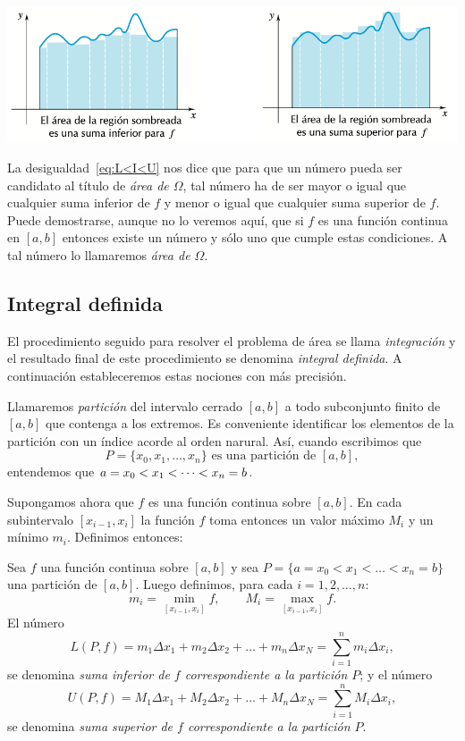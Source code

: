 \centerline{
  \includegraphics[width=.9\textwidth]{pics/sumas-superiores-inferiores.png}
}

La desigualdad~\eqref{eq:L<I<U} nos dice que para que un número pueda ser candidato al título de \emph{área de $\Omega$}, tal número ha de ser mayor o igual que cualquier suma inferior de $f$ y menor o igual que cualquier suma superior de $f$. Puede demostrarse, aunque no lo veremos aquí, que si $f$ es una función continua en $[a,b]$ entonces existe un número y sólo uno que cumple estas condiciones. A tal número lo llamaremos \emph{área de $\Omega$}.

\subsection*{Integral definida}

El procedimiento seguido para resolver el problema de área se llama \emph{integración} y el resultado final de este procedimiento se denomina \emph{integral definida}. A continuación estableceremos estas nociones con más precisión.

\begin{definition}
  Llamaremos \emph{partición} del intervalo cerrado $[a,b]$ a todo subconjunto finito de $[a,b]$ que contenga a los extremos. Es conveniente identificar los elementos de la partición con un índice acorde al orden narural. Así, cuando escribimos que 
  \[
  P=\{x_0,x_1, \dots ,x_n\} \text{ es una partición de $[a,b]$},
  \]
  entendemos que $\displaystyle a=x_0<x_1<\dots<x_n=b$.
\end{definition}

Supongamos ahora que $f$ es una función continua sobre $[a,b]$. En cada subintervalo $[x_{i-1},x_i]$ la función $f$ toma entonces un valor máximo $M_i$ y un mínimo $m_i$. Definimos entonces:

\begin{definition}
  Sea $f$ una función continua sobre $[a,b]$ y sea $P=\{a=x_0<x_1<\dots<x_n=b\}$ una partición de $[a,b]$. Luego definimos, para cada $i=1,2,\dots,n$:
  \[ 
    m_i = \min_{[x_{i-1},x_i]}f,
    \qquad
    M_i = \max_{[x_{i-1},x_i]}f.
  \]
  El número 
  \[
  L(P,f)= m_1 \Delta x_1 + m_2 \Delta x_2 + \dots + m_n \Delta x_N 
  = \sum_{i=1}^n m_i \Delta x_i,
  \]
  se denomina
  \emph{suma inferior de $f$ correspondiente a la partición $P$};
  y el número 
  \[
  U(P,f)= M_1 \Delta x_1 + M_2 \Delta x_2 + \dots + M_n \Delta x_N
  = \sum_{i=1}^n M_i \Delta x_i,
  \]
  se denomina \emph{suma superior de $f$ correspondiente a la partición $P$}.
\end{definition}

